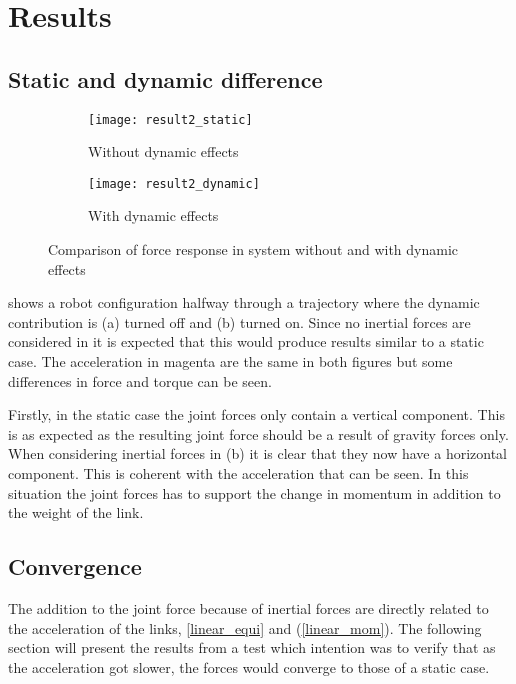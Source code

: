 \chapter{Results}

\section{Static and dynamic difference}

\begin{figure}[h!]
\begin{subfigure}[b]{0.5\textwidth}
    \centering
    \texttt{[image: result2\_static]}
    \caption{Without dynamic effects}
    \label{result_static}
\end{subfigure}
\hfill
\begin{subfigure}[b]{0.5\textwidth}
    \centering
    \texttt{[image: result2\_dynamic]}
    \caption{With dynamic effects}
\end{subfigure}
\caption{Comparison of force response in system without and with dynamic effects}
\label{result_img}
\end{figure}

 shows a robot configuration halfway through a trajectory where the dynamic contribution is (a) turned off and (b) turned on. Since no inertial forces are considered in  it is expected that this would produce results similar to a static case. The acceleration in magenta are the same in both figures but some differences in force and torque can be seen.

Firstly, in the static case the joint forces only contain a vertical component. This is as expected as the resulting joint force should be a result of gravity forces only. When considering inertial forces in (b) it is clear that they now have a horizontal component. This is coherent with the acceleration that can be seen. In this situation the joint forces has to support the change in momentum in addition to the weight of the link.

\section{Convergence}

The addition to the joint force because of inertial forces are directly related to the acceleration of the links,  \eqref{linear_equi} and (\ref{linear_mom}). The following section will present the results from a test which intention was to verify that as the acceleration got slower, the forces would converge to those of a static case.

